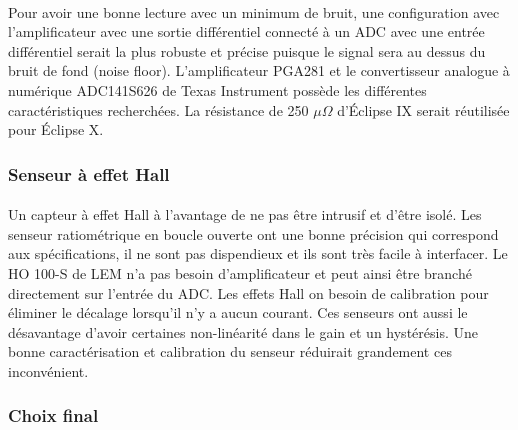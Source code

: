 	\paragraph*{}
	Pour avoir une bonne lecture avec un minimum de bruit, une configuration avec l'amplificateur avec une sortie différentiel connecté à un ADC avec une entrée différentiel serait la plus robuste et précise puisque le signal sera au dessus du bruit de fond (noise floor). L'amplificateur PGA281 et le convertisseur analogue à numérique ADC141S626 de Texas Instrument possède les différentes caractéristiques recherchées. La résistance de 250 $\mu \Omega$ d'Éclipse IX serait réutilisée pour Éclipse X.
	
	\subsubsection*{Senseur à effet Hall}
	\paragraph*{}	
	Un capteur à effet Hall à l'avantage de ne pas être intrusif et d'être isolé. Les senseur ratiométrique en boucle ouverte ont une bonne précision qui correspond aux spécifications, il ne sont pas dispendieux et ils sont très facile à interfacer. Le HO 100-S de LEM n'a pas besoin d'amplificateur et peut ainsi être branché directement sur l'entrée du ADC. Les effets Hall on besoin de calibration pour éliminer le décalage lorsqu'il n'y a aucun courant. Ces senseurs ont aussi le désavantage d'avoir certaines non-linéarité dans le gain et un hystérésis. Une bonne caractérisation et calibration du senseur réduirait grandement ces inconvénient.
	
	\subsubsection*{Choix final}
	\paragraph*{}
		